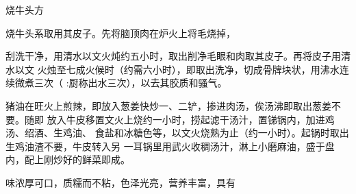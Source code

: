\begin{recipe}{烧牛头方}

\ingredients


\preparation

烧牛头系取用其皮子。先将脑顶肉在炉火上将毛烧掉，

刮洗干净，用清水以文火炖约五小时，取出削净毛眼和肉取其皮子。再将皮子用清水以文
火烛至七成火候时（约需六小时），即取出洗净，切成骨牌块状，用沸水连续微煮三次（
:厨称出水三次），以去其胶质和骚气。

猪油在旺火上煎辣，即放入葱姜快炒一、二铲，掺进肉汤，俟汤沸即取出葱姜不要。随即
放入牛皮移置文火上烧约一小时，捞起滤干汤汁，置锑锅内，加进鸡汤、绍酒、生鸡油、
食盐和冰糖色等，以文火烧熟为止（约一小时）。起锅时取出生鸡油渣不要，牛皮转入另
一耳锅里用武火收稠汤汁，淋上小磨麻油，盛于盘内，配上刚炒好的鲜菜即成。

\features

味浓厚可口，质糯而不粘，色泽光亮，营养丰富，具有

\end{recipe}

